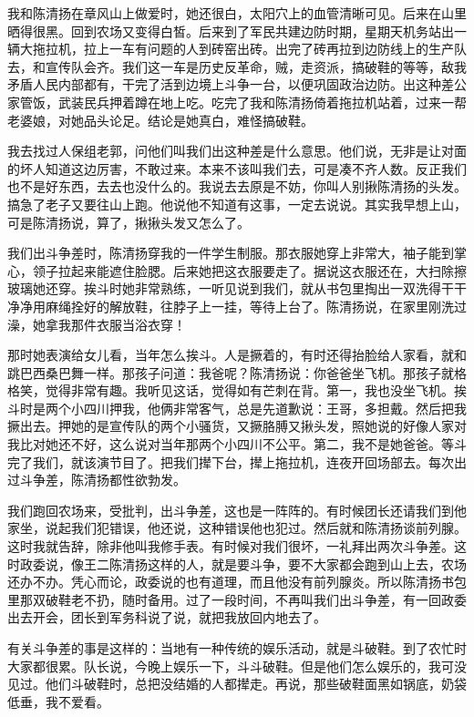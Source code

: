 我和陈清扬在章风山上做爱时，她还很白，太阳穴上的血管清晰可见。后来在山里晒得很黑。回到农场又变得白皙。后来到了军民共建边防时期，星期天机务站出一辆大拖拉机，拉上一车有问题的人到砖窑出砖。出完了砖再拉到边防线上的生产队去，和宣传队会齐。我们这一车是历史反革命，贼，走资派，搞破鞋的等等，敌我矛盾人民内部都有，干完了活到边境上斗争一台，以便巩固政治边防。出这种差公家管饭，武装民兵押着蹲在地上吃。吃完了我和陈清扬倚着拖拉机站着，过来一帮老婆娘，对她品头论足。结论是她真白，难怪搞破鞋。 
 
 我去找过人保组老郭，问他们叫我们出这种差是什么意思。他们说，无非是让对面的坏人知道这边厉害，不敢过来。本来不该叫我们去，可是凑不齐人数。反正我们也不是好东西，去去也没什么的。我说去去原是不妨，你叫人别揪陈清扬的头发。搞急了老子又要往山上跑。他说他不知道有这事，一定去说说。其实我早想上山，可是陈清扬说，算了，揪揪头发又怎么了。 
 
 我们出斗争差时，陈清扬穿我的一件学生制服。那衣服她穿上非常大，袖子能到掌心，领子拉起来能遮住脸腮。后来她把这衣服要走了。据说这衣服还在，大扫除擦玻璃她还穿。挨斗时她非常熟练，一听见说到我们，就从书包里掏出一双洗得干干净净用麻绳拴好的解放鞋，往脖子上一挂，等待上台了。陈清扬说，在家里刚洗过澡，她拿我那件衣服当浴衣穿！ 
 
 那时她表演给女儿看，当年怎么挨斗。人是撅着的，有时还得抬脸给人家看，就和跳巴西桑巴舞一样。那孩子问道：我爸呢？陈清扬说：你爸爸坐飞机。那孩子就格格笑，觉得非常有趣。我听见这话，觉得如有芒刺在背。第一，我也没坐飞机。挨斗时是两个小四川押我，他俩非常客气，总是先道歉说：王哥，多担戴。然后把我撅出去。押她的是宣传队的两个小骚货，又撅胳膊又揪头发，照她说的好像人家对我比对她还不好，这么说对当年那两个小四川不公平。第二，我不是她爸爸。等斗完了我们，就该演节目了。把我们撵下台，撵上拖拉机，连夜开回场部去。每次出过斗争差，陈清扬都性欲勃发。 
 
 我们跑回农场来，受批判，出斗争差，这也是一阵阵的。有时候团长还请我们到他家坐，说起我们犯错误，他还说，这种错误他也犯过。然后就和陈清扬谈前列腺。这时我就告辞，除非他叫我修手表。有时候对我们很坏，一礼拜出两次斗争差。这时政委说，像王二陈清扬这样的人，就是要斗争，要不大家都会跑到山上去，农场还办不办。凭心而论，政委说的也有道理，而且他没有前列腺炎。所以陈清扬书包里那双破鞋老不扔，随时备用。过了一段时间，不再叫我们出斗争差，有一回政委出去开会，团长到军务科说了说，就把我放回内地去了。 
 
 有关斗争差的事是这样的：当地有一种传统的娱乐活动，就是斗破鞋。到了农忙时大家都很累。队长说，今晚上娱乐一下，斗斗破鞋。但是他们怎么娱乐的，我可没见过。他们斗破鞋时，总把没结婚的人都撵走。再说，那些破鞋面黑如锅底，奶袋低垂，我不爱看。 
 
